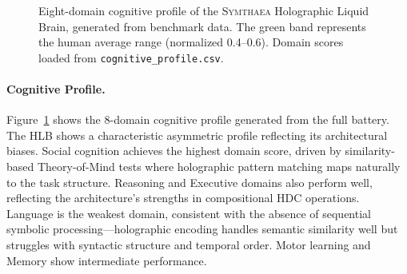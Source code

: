 \documentclass[11pt,letterpaper]{article}
\newcommand{\symthaea}{\textsc{Symthaea}}
\newcommand{\hlb}{\textsc{HLB}}
\begin{document}
\begin{figure}[t]
\caption{Eight-domain cognitive profile of the \symthaea{} Holographic Liquid Brain, generated from benchmark data. The green band represents the human average range (normalized 0.4--0.6). Domain scores loaded from \texttt{cognitive\_profile.csv}.}
\label{fig:radar}
\end{figure}

\paragraph{Cognitive Profile.} Figure~\ref{fig:radar} shows the 8-domain cognitive profile generated from the full battery. The \hlb{} shows a characteristic asymmetric profile reflecting its architectural biases. Social cognition achieves the highest domain score, driven by similarity-based Theory-of-Mind tests where holographic pattern matching maps naturally to the task structure. Reasoning and Executive domains also perform well, reflecting the architecture's strengths in compositional HDC operations. Language is the weakest domain, consistent with the absence of sequential symbolic processing---holographic encoding handles semantic similarity well but struggles with syntactic structure and temporal order. Motor learning and Memory show intermediate performance.
\end{document}
